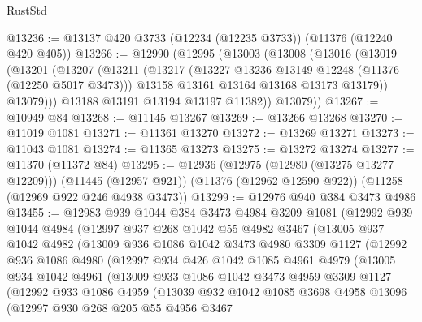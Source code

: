 \begin{lexlean}{RustStd}
\begin{coremodule}
{\begin{coremodule}
{{{{{{{{{{{{{{{{{{{{{{{{{{{{{{{{{{{{{{{{{{{{{{{{{{{{{{{{{{{{{{{{{{{{{{{{{{{{{{{{{{{{{@13236 := @13137 @420 @3733 (@12234 (@12235 @3733)) (@11376 (@12240 @420 @405))
@13266 := @12990
    (@12995
      (@13003
        (@13008
          (@13016
            (@13019
              (@13201
                (@13207
                  (@13211
                    (@13217
                      (@13227 @13236 @13149 @12248 (@11376 (@12250 @5017 @3473)))
                      @13158
                      @13161
                      @13164
                      @13168
                      @13173
                      @13179))
                  @13079)))
            @13188
            @13191
            @13194
            @13197
            @11382))
        @13079))
@13267 := @10949 @84
@13268 := @11145 @13267
@13269 := @13266 @13268
@13270 := @11019 @1081
@13271 := @11361 @13270
@13272 := @13269 @13271
@13273 := @11043 @1081
@13274 := @11365 @13273
@13275 := @13272 @13274
@13277 := @11370 (@11372 @84)
@13295 := @12936
    (@12975 (@12980 (@13275 @13277 @12209)))
    (@11445 (@12957 @921))
    (@11376 (@12962 @12590 @922))
    (@11258 (@12969 @922 @246 @4938 @3473))
@13299 := @12976 @940 @384 @3473 @4986
@13455 := @12983
    @939
    @1044
    @384
    @3473
    @4984
    @3209
    @1081
    (@12992
      @939
      @1044
      @4984
      (@12997
        @937
        @268
        @1042
        @55
        @4982
        @3467
        (@13005
          @937
          @1042
          @4982
          (@13009
            @936
            @1086
            @1042
            @3473
            @4980
            @3309
            @1127
            (@12992
              @936
              @1086
              @4980
              (@12997
                @934
                @426
                @1042
                @1085
                @4961
                @4979
                (@13005
                  @934
                  @1042
                  @4961
                  (@13009
                    @933
                    @1086
                    @1042
                    @3473
                    @4959
                    @3309
                    @1127
                    (@12992
                      @933
                      @1086
                      @4959
                      (@13039
                        @932
                        @1042
                        @1085
                        @3698
                        @4958
                        @13096
                        (@12997
                          @930
                          @268
                          @205
                          @55
                          @4956
                          @3467
}}}}}}}}}}}}}}}}}}}}}}}}}}}}}}}}}}}}}}}}}}}}}}}}}}}}}}}}}}}}}}}}}}}}}}}}}}}}}}}}}}}}}
\end{coremodule}}
\end{coremodule}
\end{lexlean}
